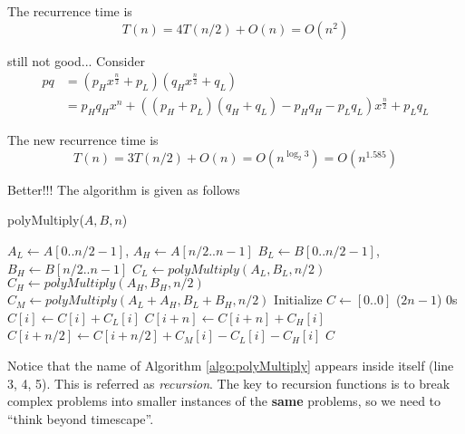                 The recurrence time is
                \begin{equation*}
                    T(n) = 4T(n/2) + O(n) = O(n^2)
                \end{equation*}

                still not good... Consider
                \begin{align*}
                    pq &= (p_H x^{\frac{n}{2}} + p_L)(q_H x^{\frac{n}{2}} + q_L) \\
                       &= p_Hq_Hx^n + ((p_H + p_L)(q_H + q_L) - p_Hq_H - p_Lq_L)x^{\frac{n}{2}} + p_Lq_L
                \end{align*}

                The new recurrence time is
                \begin{equation*}
                    T(n) = 3T(n/2) + O(n) = O(n^{\log_2 3}) = O(n^{1.585})
                \end{equation*}

                Better!!! The algorithm is given as follows

                \begin{algorithm}[H]
                    \caption{polyMultiply($A, B, n$)}
                    \label{algo:polyMultiply}
                    \begin{algorithmic}[1]
                        \State $A_L \gets A[0 .. n/2-1]$, $A_H \gets A[n/2 .. n-1]$
                        \State $B_L \gets B[0 .. n/2-1]$, $B_H \gets B[n/2 .. n-1]$
                        \State $C_L \gets polyMultiply(A_L, B_L, n/2)$
                        \State $C_H \gets polyMultiply(A_H, B_H, n/2)$
                        \State $C_M \gets polyMultiply(A_L + A_H, B_L + B_H, n/2)$
                        \State Initialize $C \gets [0 .. 0]$ ($2n - 1$) 0s
                            \State $C[i] \gets C[i] + C_L[i]$
                            \State $C[i + n] \gets C[i + n] + C_H[i]$
                            \State $C[i + n/2] \gets C[i + n/2] + C_M[i] - C_L[i] - C_H[i]$
                        \EndFor
                        \State \Return $C$
                    \end{algorithmic}
                \end{algorithm}

                Notice that the name of Algorithm \ref{algo:polyMultiply} appears inside itself (line 3, 4, 5). This is referred as \textit{recursion}. The key to recursion functions is to break complex problems into smaller instances of the \textbf{same} problems, so we need to ``think beyond timescape''.

